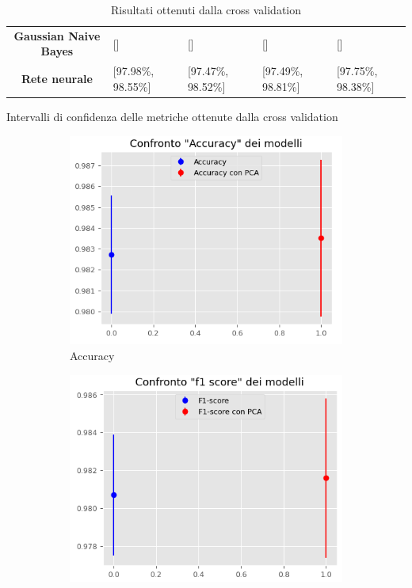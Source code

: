 \begin{table}[!ht]
\begin{subtable}[h]{1\textwidth}
\begin{tabular}{@{}cllll@{}}
            \cellcolor[HTML]{EFEFEF}\textbf{Gaussian Naive Bayes} & []                   & []                  & []                 & []                 \\
            \cellcolor[HTML]{EFEFEF}\textbf{Rete neurale}         & [97.98\%, 98.55\%]   & [97.47\%, 98.52\%]  & [97.49\%, 98.81\%] & [97.75\%, 98.38\%] \\ \bottomrule
        \end{tabular}
        \caption{Intervalli di confidenza delle metriche ottenute dalla cross validation}
        \label{tab:intervalli_confidenza_corr}
    \end{subtable}
    \caption{Risultati ottenuti dalla cross validation}
    \label{tab:intervalli_confidenza_corr}
\end{table}
\begin{figure}[!ht]
    \centering
    \begin{subfigure}[b]{0.4\textwidth}
        \centering
        \includegraphics[width=\textwidth]{img/rete/intervalliAcc.png}
        \caption{Accuracy}
        \label{fig:acc}
    \end{subfigure}
    \hfill
    \begin{subfigure}[b]{0.4\textwidth}
        \centering
        \includegraphics[width=\textwidth]{img/rete/intervalliF1.png}

\end{subfigure}
\end{figure}
